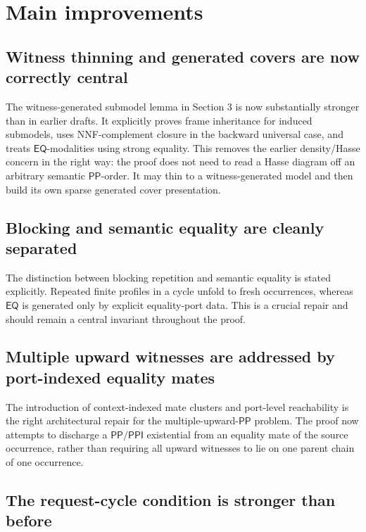 \documentclass[11pt]{article}
\newcommand{\EQ}{\mathsf{EQ}}
\newcommand{\PP}{\mathsf{PP}}
\newcommand{\PPI}{\mathsf{PPI}}
\begin{document}
\section{Main improvements}

\subsection{Witness thinning and generated covers are now correctly central}

The witness-generated submodel lemma in Section 3 is now substantially stronger than in earlier drafts.  It explicitly proves frame inheritance for induced submodels, uses NNF-complement closure in the backward universal case, and treats $\EQ$-modalities using strong equality.  This removes the earlier density/Hasse concern in the right way: the proof does not need to read a Hasse diagram off an arbitrary semantic $\PP$-order.  It may thin to a witness-generated model and then build its own sparse generated cover presentation.

\subsection{Blocking and semantic equality are cleanly separated}

The distinction between blocking repetition and semantic equality is stated explicitly.  Repeated finite profiles in a cycle unfold to fresh occurrences, whereas $\EQ$ is generated only by explicit equality-port data.  This is a crucial repair and should remain a central invariant throughout the proof.

\subsection{Multiple upward witnesses are addressed by port-indexed equality mates}

The introduction of context-indexed mate clusters and port-level reachability is the right architectural repair for the multiple-upward-$\PP$ problem.  The proof now attempts to discharge a $\PP/\PPI$ existential from an equality mate of the source occurrence, rather than requiring all upward witnesses to lie on one parent chain of one occurrence.

\subsection{The request-cycle condition is stronger than before}
\end{document}
